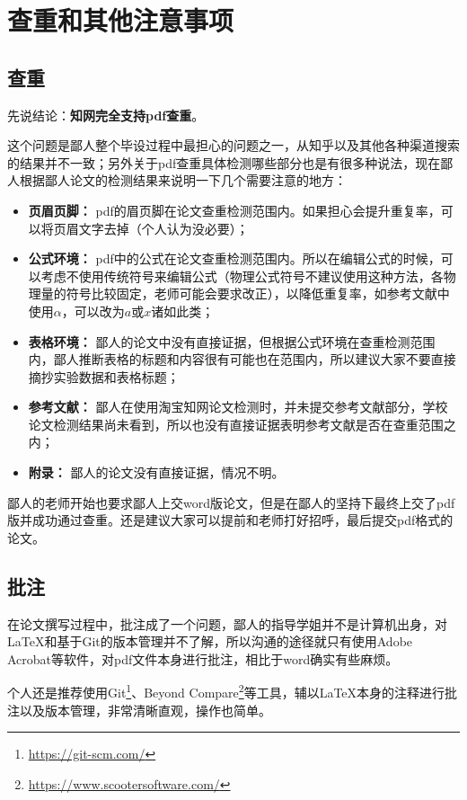 \chapter{查重和其他注意事项}
\section{查重}

先说结论：{\large\textbf{知网完全支持pdf查重}}。

这个问题是鄙人整个毕设过程中最担心的问题之一，从知乎以及其他各种渠道搜索的结果并不一致；另外关于pdf查重具体检测哪些部分也是有很多种说法，现在鄙人根据鄙人论文的检测结果来说明一下几个需要注意的地方：

\begin{itemize}
  \item \textbf{页眉页脚：} pdf的眉页脚在论文查重检测范围内。如果担心会提升重复率，可以将页眉文字去掉（个人认为没必要）；
  \item \textbf{公式环境：} pdf中的公式在论文查重检测范围内。所以在编辑公式的时候，可以考虑不使用传统符号来编辑公式（物理公式符号不建议使用这种方法，各物理量的符号比较固定，老师可能会要求改正），以降低重复率，如参考文献中使用$\alpha$，可以改为$a$或$x$诸如此类；
  \item \textbf{表格环境：} 鄙人的论文中没有直接证据，但根据公式环境在查重检测范围内，鄙人推断表格的标题和内容很有可能也在范围内，所以建议大家不要直接摘抄实验数据和表格标题；
  \item \textbf{参考文献：} 鄙人在使用淘宝知网论文检测时，并未提交参考文献部分，学校论文检测结果尚未看到，所以也没有直接证据表明参考文献是否在查重范围之内；
  \item \textbf{附录：} 鄙人的论文没有直接证据，情况不明。
\end{itemize}

鄙人的老师开始也要求鄙人上交word版论文，但是在鄙人的坚持下最终上交了pdf版并成功通过查重。还是建议大家可以提前和老师打好招呼，最后提交pdf格式的论文。

\section{批注}
在论文撰写过程中，批注成了一个问题，鄙人的指导学姐并不是计算机出身，对\LaTeX 和基于Git的版本管理并不了解，所以沟通的途径就只有使用Adobe Acrobat等软件，对pdf文件本身进行批注，相比于word确实有些麻烦。

个人还是推荐使用Git\footnote{\url{https://git-scm.com/}}、Beyond Compare\footnote{\url{https://www.scootersoftware.com/}}等工具，辅以\LaTeX 本身的注释进行批注以及版本管理，非常清晰直观，操作也简单。


